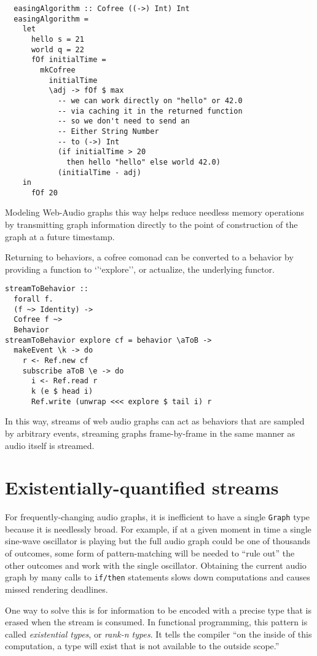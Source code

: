 \documentclass{sig-alternate}
\begin{document}
\begin{sloppypar}
\begin{verbatim}
  easingAlgorithm :: Cofree ((->) Int) Int
  easingAlgorithm =
    let
      hello s = 21
      world q = 22
      fOf initialTime =
        mkCofree
          initialTime
          \adj -> fOf $ max
            -- we can work directly on "hello" or 42.0
            -- via caching it in the returned function
            -- so we don't need to send an
            -- Either String Number
            -- to (->) Int
            (if initialTime > 20
              then hello "hello" else world 42.0)
            (initialTime - adj)
    in
      fOf 20
\end{verbatim}
  Modeling Web-Audio graphs this way helps reduce needless memory operations by transmitting graph information directly to the point of construction of the graph at a future timestamp.

  Returning to behaviors, a cofree comonad can be converted to a behavior by providing a function to `'`explore'', or actualize, the underlying functor.

  \begin{verbatim}
streamToBehavior ::
  forall f.
  (f ~> Identity) ->
  Cofree f ~>
  Behavior
streamToBehavior explore cf = behavior \aToB ->
  makeEvent \k -> do
    r <- Ref.new cf
    subscribe aToB \e -> do
      i <- Ref.read r
      k (e $ head i)
      Ref.write (unwrap <<< explore $ tail i) r
  \end{verbatim}

  In this way, streams of web audio graphs can act as behaviors that are sampled by arbitrary events, streaming graphs frame-by-frame in the same manner as audio itself is streamed.

  \section{Existentially-quantified streams}

  For frequently-changing audio graphs, it is inefficient to have a single \texttt{Graph} type because it is needlessly broad. For example, if at a given moment in time a single sine-wave oscillator is playing but the full audio graph could be one of thousands of outcomes, some form of pattern-matching will be needed to ``rule out'' the other outcomes and work with the single oscillator. Obtaining the current audio graph by many calls to \texttt{if/then} statements slows down computations and causes missed rendering deadlines.

  One way to solve this is for information to be encoded with a precise type that is erased when the stream is consumed. In functional programming, this pattern is called \textit{existential types}, or \textit{rank-n types}. It tells the compiler ``on the inside of this computation, a type will exist that is not available to the outside scope.''


\end{sloppypar}
\end{document}
